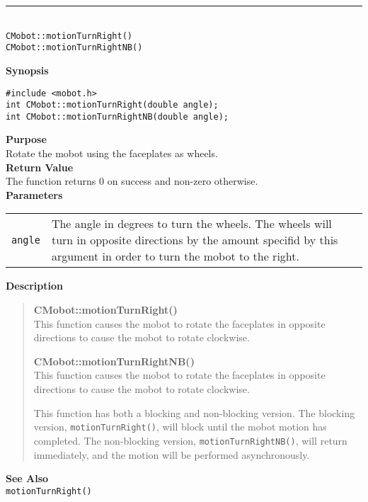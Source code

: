 \noindent
\vspace{5pt}
\rule{4.5in}{0.015in}\\
\noindent
{\LARGE \texttt{CMobot::motionTurnRight()}}\\
{\LARGE \texttt{CMobot::motionTurnRightNB()}}\\
{}

\noindent
{\bf Synopsis}
\vspace{-8pt}
\begin{verbatim}
#include <mobot.h>
int CMobot::motionTurnRight(double angle);
int CMobot::motionTurnRightNB(double angle);
\end{verbatim}

\noindent
{\bf Purpose}\\
Rotate the mobot using the faceplates as wheels.\\

\noindent
{\bf Return Value}\\
The function returns 0 on success and non-zero otherwise.\\

\noindent
{\bf Parameters}\\
\vspace{-0.1in}
\begin{description}
\item               
\begin{tabular}{p{10 mm}p{145 mm}}
\texttt{angle} & The angle in degrees to turn the wheels. The wheels will turn in opposite directions by the amount specifid by this argument in order to turn the mobot to the right. \\
\end{tabular}
\end{description}

\noindent
{\bf Description}\\
\vspace{-12pt}
\begin{quote}
{\bf CMobot::motionTurnRight()}\\
This function causes the mobot to rotate the faceplates in opposite directions
to cause the mobot to rotate clockwise.

{\bf CMobot::motionTurnRightNB()}\\
This function causes the mobot to rotate the faceplates in opposite directions
to cause the mobot to rotate clockwise.

This function has both a blocking and non-blocking version.
The blocking version, \texttt{motionTurnRight()}, will block until the
mobot motion has completed. The non-blocking version, \texttt{motionTurnRightNB()},
will return immediately, and the motion will be performed asynchronously.\\
\end{quote}


\noindent
{\bf See Also}\\
\texttt{motionTurnRight()}

